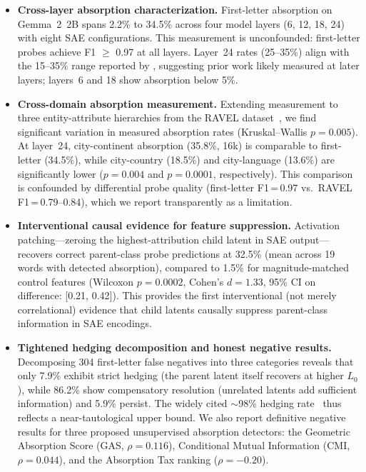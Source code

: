 \documentclass{article}
\begin{document}
\begin{itemize}
\item \textbf{Cross-layer absorption characterization.} First-letter absorption on Gemma~2~2B spans 2.2\% to 34.5\% across four model layers (6, 12, 18, 24) with eight SAE configurations. This measurement is unconfounded: first-letter probes achieve F1 $\geq$ 0.97 at all layers. Layer~24 rates (25--35\%) align with the 15--35\% range reported by \citet{chanin2024absorption}, suggesting prior work likely measured at later layers; layers~6 and 18 show absorption below 5\%.

\item \textbf{Cross-domain absorption measurement.} Extending measurement to three entity-attribute hierarchies from the RAVEL dataset~\citep{huang2024ravel}, we find significant variation in measured absorption rates (Kruskal--Wallis $p = 0.005$). At layer~24, city-continent absorption (35.8\%, 16k) is comparable to first-letter (34.5\%), while city-country (18.5\%) and city-language (13.6\%) are significantly lower ($p = 0.004$ and $p = 0.0001$, respectively). This comparison is confounded by differential probe quality (first-letter F1\,=\,0.97 vs.\ RAVEL F1\,=\,0.79--0.84), which we report transparently as a limitation.

\item \textbf{Interventional causal evidence for feature suppression.} Activation patching---zeroing the highest-attribution child latent in SAE output---recovers correct parent-class probe predictions at 32.5\% (mean across 19 words with detected absorption), compared to 1.5\% for magnitude-matched control features (Wilcoxon $p = 0.0002$, Cohen's $d = 1.33$, 95\% CI on difference: [0.21, 0.42]). This provides the first interventional (not merely correlational) evidence that child latents causally suppress parent-class information in SAE encodings.

\item \textbf{Tightened hedging decomposition and honest negative results.} Decomposing 304 first-letter false negatives into three categories reveals that only 7.9\% exhibit strict hedging (the parent latent itself recovers at higher $L_0$), while 86.2\% show compensatory resolution (unrelated latents add sufficient information) and 5.9\% persist. The widely cited ${\sim}$98\% hedging rate~\citep{chanin2025hedging} thus reflects a near-tautological upper bound. We also report definitive negative results for three proposed unsupervised absorption detectors: the Geometric Absorption Score (GAS, $\rho = 0.116$), Conditional Mutual Information (CMI, $\rho = 0.044$), and the Absorption Tax ranking ($\rho = -0.20$).
\end{itemize}
\end{document}
